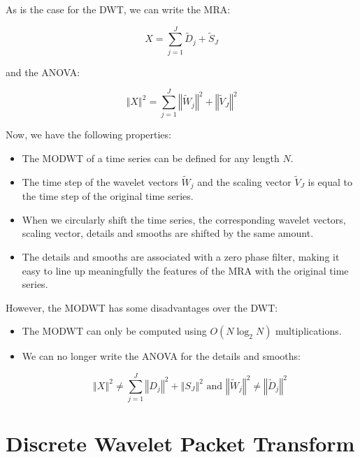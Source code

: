 \documentclass[workdone.tex]{subfiles}
\begin{document}
As is the case for the DWT, we can write the MRA:

\begin{equation}
X = \sum_{j = 1}^{J} \widetilde{D}_j + \widetilde{S}_J
\end{equation}

and the ANOVA:

\begin{equation}
\left\Vert X \right\Vert ^2 = \sum_{j = 1}^{J} \left\Vert \widetilde{W}_j \right\Vert ^2 + \left\Vert \widetilde{V}_J \right\Vert ^2
\end{equation}

Now, we have the following properties:

\begin{itemize}
	\item The MODWT of a time series can be defined for any length $N$.
	\item The time step of the wavelet vectors $\widetilde{W}_j$ and the scaling vector $\widetilde{V}_J$ is equal to the time step of the original time series.
	\item When we circularly shift the time series, the corresponding wavelet vectors, scaling vector, details and smooths are shifted by the same amount.
	\item The details and smooths are associated with a zero phase filter, making it easy to line up meaningfully the features of the MRA with the original time series.
\end{itemize}

However, the MODWT has some disadvantages over the DWT:

\begin{itemize}
	\item The MODWT can only be computed using $O \left( N \log_2 N \right)$ multiplications.
	\item We can no longer write the ANOVA for the details and smooths:

\begin{equation}
\left\Vert X \right\Vert ^2 \neq \sum_{j = 1}^{J} \left\Vert D_j \right\Vert ^2 + \left\Vert S_J \right\Vert ^2 \text{ and } \left\Vert \widetilde{W}_j \right\Vert ^2 \neq \left\Vert \widetilde{D}_j \right\Vert ^2
\end{equation}

\end{itemize}

\section{Discrete Wavelet Packet Transform}
\end{document}
